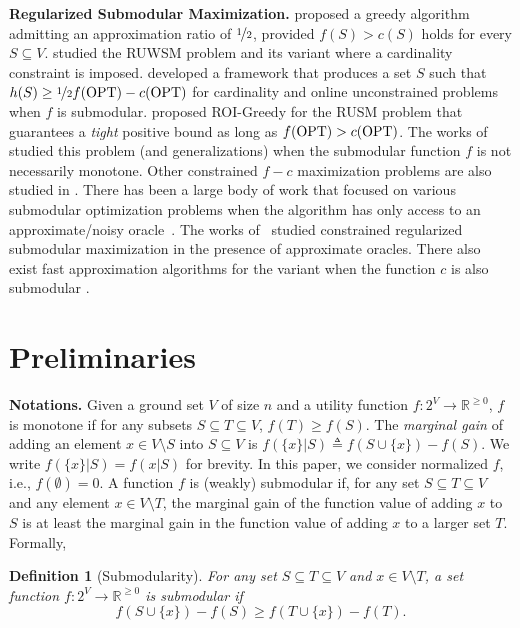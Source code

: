 \documentclass[10pt]{article} %
\newtheorem{definition}{Definition}
\theoremstyle{remark}
\newcommand{\OPT}{{\rm OPT}}
\begin{document}
\textbf{Regularized Submodular Maximization.} \citet{buchbinder2015tight} proposed a greedy algorithm admitting an approximation ratio of $\nicefrac{1}{2}$, provided  $f(S)>c(S)$ holds for every $S \subseteq V$. \citet{harshaw2019submodular} studied the RUWSM problem and its variant where a cardinality constraint is imposed. 
\citet{nikolakaki2021efficient} developed a framework that produces a set $S$ such that $h(S) \geq \nicefrac{1}{2}f(\OPT) - c(\OPT)$ for cardinality and online unconstrained problems when $f$ is submodular. 
\citet{jin2021unconstrained} proposed ROI-Greedy for the RUSM problem that guarantees a \emph{tight} positive bound as long as $f(\OPT)>c(\OPT)$.  The works of~\cite{bodek2022maximizing, Qi22} studied this problem (and generalizations) when the submodular function $f$ is not necessarily monotone. Other constrained $f-c$ maximization problems are also studied in \cite{sviridenko2017optimal, cui2023constrained}. There has been a large body of work that focused on various submodular optimization problems when the algorithm has only access to an approximate/noisy oracle~\cite{hassidim2017submodular, qian2017subset,crawford2019submodular,nie2023framework,el2020optimal}. The works of~\cite{gong2023algorithms,geng2022bicriteria,wang2021maximizing} studied constrained regularized submodular maximization in the presence of approximate oracles.  There also exist fast approximation algorithms for the variant when the function $c$ is also submodular \cite{PZBP23,perrault2022approximation}.%
\section{Preliminaries}
\label{sec:preliminaries}
\textbf{Notations.} 
Given a ground set $V$ of size $n$ and a utility function $f:2^V\rightarrow \mathbb{R}^{\geq 0}$, $f$ is monotone if for any subsets $S \subseteq T \subseteq V$, $f(T) \geq f(S)$. The {\em marginal gain} of adding an element $x \in V \setminus S$ into $S\subseteq V$ is $f(\{x\}|S) \triangleq f(S\cup \{x\})-f(S)$. We write $f(\{x\}|S) = f(x|S)$ for brevity. In this paper, we consider normalized $f$, i.e., $f(\emptyset)=0$. A function $f$ is (weakly) submodular if, for any set $S \subseteq T \subseteq V$ and any element $x \in V \setminus T$, the marginal gain of the function value of adding $x$ to $S$ is at least the marginal gain in the function value of adding $x$ to a larger set $T$.  Formally, 

\begin{definition}[Submodularity]
    \label{def:sub}
    For any set $S \subseteq T \subseteq V$ and $x \in V \setminus T$, a set function $f:2^V \rightarrow \mathbb{R}^{\geq 0}$ is submodular if
    \begin{equation}
\label{eq:marginal-gain}
    f(S \cup \{x\})-f(S)\geq f(T \cup \{x\})-f(T).
\end{equation}
\end{definition}
\end{document}
